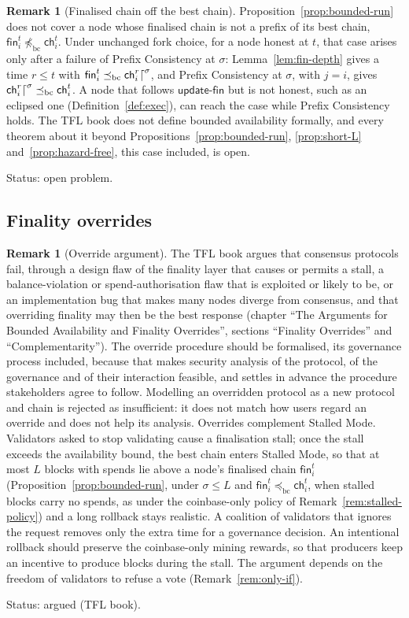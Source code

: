 \documentclass[11pt,a4paper]{article}
\theoremstyle{definition}
\newtheorem{remark}[theorem]{Remark}
\newcommand{\bc}{\mathrm{bc}}
\newcommand{\preceqbc}{\preceq_{\bc}}
\newcommand{\ch}{\mathsf{ch}}
\newcommand{\fin}{\mathsf{fin}}
\newcommand{\updatefin}{\mathsf{update\text{-}fin}}
\begin{document}
\begin{remark}[Finalised chain off the best chain]\label{rem:fin-off-chain}
Proposition~\ref{prop:bounded-run} does not cover a node whose finalised
chain is not a prefix of its best chain, $\fin_i^t \mathrel{\not\preceq}_{\bc}
\ch_i^t$. Under unchanged fork choice, for a node honest at $t$, that case
arises only after a failure of Prefix Consistency at $\sigma$:
Lemma~\ref{lem:fin-depth} gives a time $r \le t$ with $\fin_i^t \preceqbc
\ch_i^r\trunc{\sigma}$, and Prefix Consistency at $\sigma$, with $j = i$, gives
$\ch_i^r\trunc{\sigma} \preceqbc \ch_i^t$. A node that follows $\updatefin$ but
is not honest, such as an eclipsed one (Definition~\ref{def:exec}), can reach
the case while Prefix Consistency holds. The TFL book does not define bounded
availability formally, and every theorem about it beyond
Propositions~\ref{prop:bounded-run}, \ref{prop:short-L}
and~\ref{prop:hazard-free}, this case included, is open.

Status: open problem.
\end{remark}

\subsection{Finality overrides}\label{sec:bd-override}

\begin{remark}[Override argument]\label{rem:override}
The TFL book argues that consensus protocols fail, through a design flaw of
the finality layer that causes or permits a stall, a balance-violation or
spend-authorisation flaw that is exploited or likely to be, or an
implementation bug that makes many nodes diverge from consensus, and that
overriding finality may then be the best response (chapter ``The Arguments
for Bounded Availability and Finality Overrides'', sections ``Finality
Overrides'' and ``Complementarity''). The override procedure should be
formalised, its governance process included, because that makes security
analysis of the protocol, of the governance and of their interaction
feasible, and settles in advance the procedure stakeholders agree to
follow. Modelling an overridden protocol as a new protocol and chain is
rejected as insufficient: it does not match how users regard an override
and does not help its analysis. Overrides complement Stalled Mode.
Validators asked to stop validating cause a finalisation stall; once the
stall exceeds the availability bound, the best chain enters Stalled Mode,
so that at most $L$ blocks with spends lie above a node's finalised chain
$\fin_i^t$ (Proposition~\ref{prop:bounded-run}, under $\sigma \le L$ and
$\fin_i^t \preceqbc \ch_i^t$, when stalled blocks carry no spends, as under the
coinbase-only policy of Remark~\ref{rem:stalled-policy}) and a long rollback
stays realistic. A coalition of validators that ignores the request removes only
the extra time for a governance decision. An intentional rollback should
preserve the coinbase-only mining rewards, so that producers keep an incentive
to produce blocks during the stall. The argument depends on the freedom of
validators to refuse a vote (Remark~\ref{rem:only-if}).

Status: argued (TFL book).
\end{remark}
\end{document}

